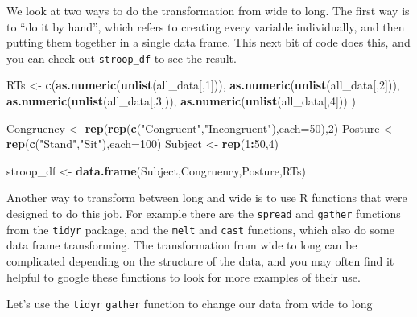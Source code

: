 \documentclass[]{book}
\newenvironment{Shaded}{\begin{snugshade}}{\end{snugshade}}
\newcommand{\KeywordTok}[1]{\textcolor[rgb]{0.13,0.29,0.53}{\textbf{#1}}}
\newcommand{\DataTypeTok}[1]{\textcolor[rgb]{0.13,0.29,0.53}{#1}}
\newcommand{\DecValTok}[1]{\textcolor[rgb]{0.00,0.00,0.81}{#1}}
\newcommand{\StringTok}[1]{\textcolor[rgb]{0.31,0.60,0.02}{#1}}
\newcommand{\OperatorTok}[1]{\textcolor[rgb]{0.81,0.36,0.00}{\textbf{#1}}}
\newcommand{\NormalTok}[1]{#1}
\begin{document}
We look at two ways to do the transformation from wide to long. The
first way is to ``do it by hand'', which refers to creating every
variable individually, and then putting them together in a single data
frame. This next bit of code does this, and you can check out
\texttt{stroop\_df} to see the result.

\begin{Shaded}
\begin{Highlighting}[]
\NormalTok{RTs <-}\StringTok{ }\KeywordTok{c}\NormalTok{(}\KeywordTok{as.numeric}\NormalTok{(}\KeywordTok{unlist}\NormalTok{(all_data[,}\DecValTok{1}\NormalTok{])),}
         \KeywordTok{as.numeric}\NormalTok{(}\KeywordTok{unlist}\NormalTok{(all_data[,}\DecValTok{2}\NormalTok{])),}
         \KeywordTok{as.numeric}\NormalTok{(}\KeywordTok{unlist}\NormalTok{(all_data[,}\DecValTok{3}\NormalTok{])),}
         \KeywordTok{as.numeric}\NormalTok{(}\KeywordTok{unlist}\NormalTok{(all_data[,}\DecValTok{4}\NormalTok{]))}
\NormalTok{         )}

\NormalTok{Congruency <-}\StringTok{ }\KeywordTok{rep}\NormalTok{(}\KeywordTok{rep}\NormalTok{(}\KeywordTok{c}\NormalTok{(}\StringTok{"Congruent"}\NormalTok{,}\StringTok{"Incongruent"}\NormalTok{),}\DataTypeTok{each=}\DecValTok{50}\NormalTok{),}\DecValTok{2}\NormalTok{)}
\NormalTok{Posture <-}\StringTok{ }\KeywordTok{rep}\NormalTok{(}\KeywordTok{c}\NormalTok{(}\StringTok{"Stand"}\NormalTok{,}\StringTok{"Sit"}\NormalTok{),}\DataTypeTok{each=}\DecValTok{100}\NormalTok{)}
\NormalTok{Subject <-}\StringTok{ }\KeywordTok{rep}\NormalTok{(}\DecValTok{1}\OperatorTok{:}\DecValTok{50}\NormalTok{,}\DecValTok{4}\NormalTok{)}

\NormalTok{stroop_df <-}\StringTok{ }\KeywordTok{data.frame}\NormalTok{(Subject,Congruency,Posture,RTs)}
\end{Highlighting}
\end{Shaded}

Another way to transform between long and wide is to use R functions
that were designed to do this job. For example there are the
\texttt{spread} and \texttt{gather} functions from the \texttt{tidyr}
package, and the \texttt{melt} and \texttt{cast} functions, which also
do some data frame transforming. The transformation from wide to long
can be complicated depending on the structure of the data, and you may
often find it helpful to google these functions to look for more
examples of their use.

Let's use the \texttt{tidyr} \texttt{gather} function to change our data
from wide to long
\end{document}
